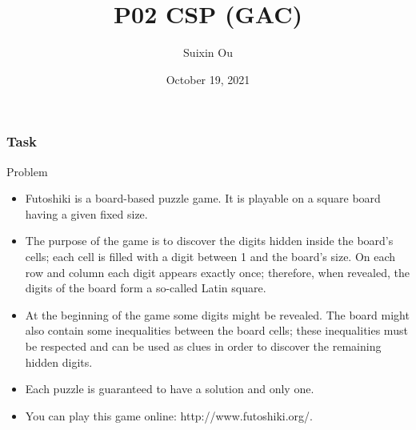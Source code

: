 \documentclass{beamer}
\title{P02 CSP (GAC)}
\author{Suixin Ou} %
\institute[SYSU] %
{
  School of Computer Science\\
  Sun Yat-sen University \\ %
  \medskip
}
\date{October 19, 2021} %
\begin{document}
\begin{frame}
  \titlepage
\end{frame}

\begin{frame}
  \frametitle{Task}
  \begin{block}{Problem}
\begin{itemize}
    \item Futoshiki is a board-based puzzle game. It is playable on a square board having a given fixed size.

     \item The purpose of the game is to discover the digits hidden inside the board’s cells; each cell is filled with a digit between 1 and the board’s size. On each row and column each digit appears exactly once; therefore, when revealed, the digits of the board form a so-called Latin square.

   \item  At the beginning of the game some digits might be revealed. The board might also contain some inequalities between the board cells; these inequalities must be respected and can be used as clues in order to discover the remaining hidden digits.

   \item  Each puzzle is guaranteed to have a solution and only one.

    \item You can play this game online: http://www.futoshiki.org/.
    \end{itemize}
  \end{block}
\end{frame}
\end{document}
